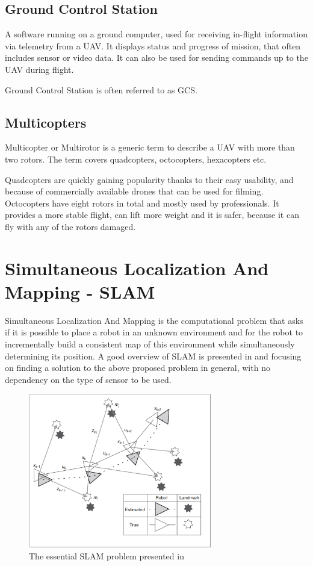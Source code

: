 \subsection{Ground Control Station}
A software running on a ground computer, used for receiving in-flight information via telemetry from a UAV.
It displays status and progress of mission, that often includes sensor or video data. It can also be used
for sending commands up to the UAV during flight.

Ground Control Station is often referred to as GCS.

\subsection{Multicopters}
Multicopter or Multirotor is a generic term to describe a UAV with more than two rotors. The term covers quadcopters,
octocopters, hexacopters etc.

Quadcopters are quickly gaining popularity thanks to their easy usability, and because of commercially available drones 
that can be used for filming. Octocopters have eight rotors in total and mostly used by professionals. It provides a more stable 
flight, can lift more weight and it is safer, because it can fly with any of the rotors damaged.

\section{Simultaneous Localization And Mapping - SLAM}
Simultaneous Localization And Mapping is the computational problem that asks if it is possible to place a robot 
in an unknown environment and for the robot to incrementally build a consistent map of this environment while 
simultaneously determining its position. A good overview of SLAM is presented in\cite{durrant2006simultaneous} 
and \cite{diebel2006representing} focusing on finding a solution to the above proposed problem in general, with no dependency 
on the type of sensor to be used.

\begin{figure}[!ht]
    \centering
	\includegraphics[width=80mm, keepaspectratio]{figures/slam_tutorial_basic_figure.png}
    \caption{The essential SLAM problem presented in \cite{durrant2006simultaneous} }
    \label{fig:slam_tutorial_basic}
\end{figure}


